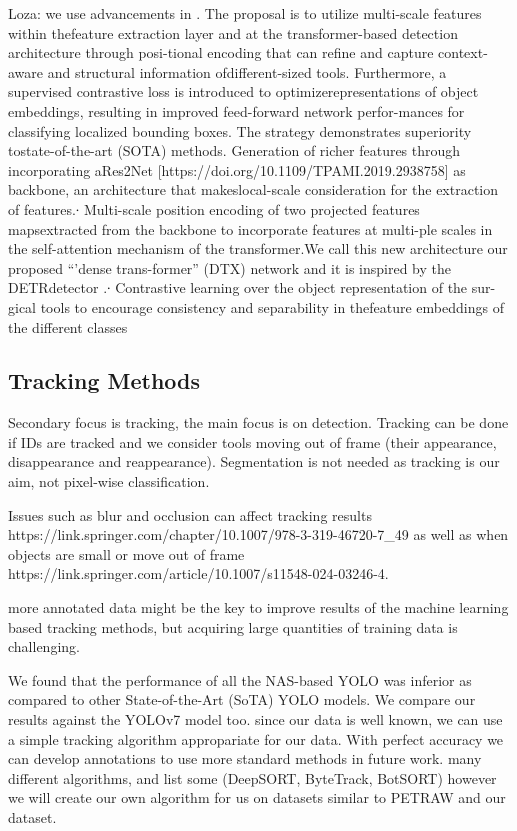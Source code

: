 Loza: we use advancements in \cite{Loza2023DTx}. The proposal is to utilize multi-scale features within thefeature extraction layer and at the transformer-based detection architecture through posi-tional encoding that can reﬁne and capture context-aware and structural information ofdifferent-sized tools. Furthermore, a supervised contrastive loss is introduced to optimizerepresentations of object embeddings, resulting in improved feed-forward network perfor-mances for classifying localized bounding boxes. The strategy demonstrates superiority tostate-of-the-art (SOTA) methods. Generation of richer features through incorporating aRes2Net [https://doi.org/10.1109/TPAMI.2019.2938758] as backbone, an architecture that makeslocal-scale consideration for the extraction of features.∙ Multi-scale position encoding of two projected features mapsextracted from the backbone to incorporate features at multi-ple scales in the self-attention mechanism of the transformer.We call this new architecture our proposed “’dense trans-former” (DTX) network and it is inspired by the DETRdetector \cite{vedaldi_end--end_2020}.∙ Contrastive learning over the object representation of the sur-gical tools to encourage consistency and separability in thefeature embeddings of the different classes


\subsection{Tracking Methods}

Secondary focus is tracking, the main focus is on detection. Tracking can be done if IDs are tracked and we consider tools moving out of frame (their appearance, disappearance and reappearance). Segmentation is not needed as tracking is our aim, not pixel-wise classification.

Issues such as blur and occlusion can affect tracking results https://link.springer.com/chapter/10.1007/978-3-319-46720-7_49 as well as when objects are small or move out of frame https://link.springer.com/article/10.1007/s11548-024-03246-4.

more annotated data might be the key to improve results of the machine learning based tracking methods, but acquiring large quantities of training data is challenging. 

We found that the performance of all the NAS-based YOLO was inferior as compared to other State-of-the-Art (SoTA) YOLO models. We compare our results against the YOLOv7 model too. since our data is well known, we can use a simple tracking algorithm appropariate for our data. With perfect accuracy we can develop annotations to use more standard methods in future work. many different algorithms, and list some (DeepSORT, ByteTrack, BotSORT) however we will create our own algorithm for us on datasets similar to PETRAW and our dataset.

